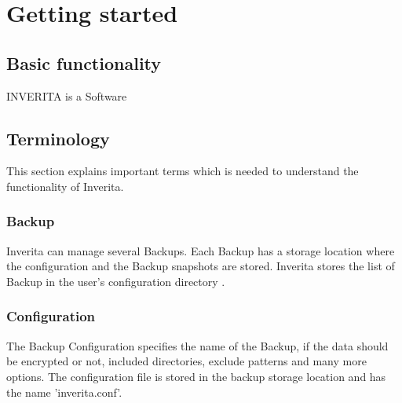 %
%
%
%


\chapter{Getting started}

\section{Basic functionality}

INVERITA is a Software


\section{Terminology}

This section explains important terms which is needed to understand
the functionality of Inverita.

\subsection{Backup}
   Inverita can manage several Backups. Each Backup has
         a storage location where the configuration and the
         Backup snapshots are stored.
         Inverita stores the list of Backup in the user's
         configuration directory .

\subsection{Configuration}
         The Backup Configuration specifies the name of the Backup,
         if the data should be encrypted or not, included
         directories, exclude patterns and many more options.
         The configuration file is stored in the backup storage
         location and has the name 'inverita.conf'.

